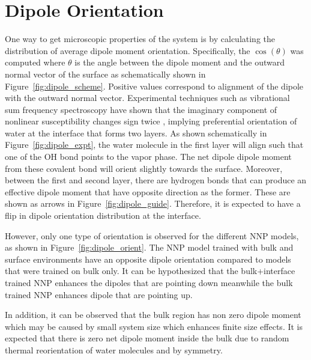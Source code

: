 \section{Dipole Orientation}
One way to get microscopic properties of the system is by calculating the
distribution of
average dipole moment orientation. Specifically, the $\cos(\theta)$ was
computed where
$\theta$ is
the angle between the dipole moment and the outward normal vector of the
surface as
schematically shown in Figure~\ref{fig:dipole_scheme}. Positive values
correspond to alignment of the dipole with the outward normal
vector. Experimental techniques such as vibrational sum frequency spectroscopy
have shown that
the imaginary component of nonlinear susceptibility changes sign twice
\cite{fan2009structure},
implying  preferential orientation of water at the
interface that forms two layers. As shown schematically in Figure~\ref{fig:dipole_expt}, the water molecule in the first layer will align such that one of the OH bond points to the vapor
phase. The net dipole dipole moment from these covalent bond will orient slightly
towards the surface. Moreover, between the first and second layer, there are
hydrogen bonds that can produce an effective dipole moment that have opposite
direction as the former. These are shown as arrows in Figure~\ref{fig:dipole_guide}. Therefore, it is expected to have a flip in dipole orientation distribution at the interface.

However, only one type of orientation is observed for the  different NNP models, as shown in Figure~\ref{fig:dipole_orient}. The NNP model trained with bulk and surface environments have an
opposite dipole
orientation compared to models that were trained on bulk only. It can be hypothesized that the bulk+interface trained NNP enhances the dipoles that are pointing down meanwhile the bulk trained NNP enhances dipole that are pointing up.

In addition, it can be
observed that the bulk region has non zero dipole moment which may be caused by
small system size which enhances finite size effects. It is expected that there is zero net
dipole moment inside the bulk due to random thermal reorientation of water
molecules and by symmetry.

